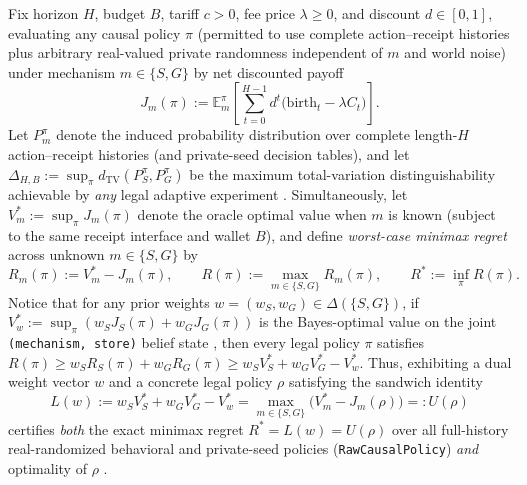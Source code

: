 \documentclass[11pt,a4paper]{article}
\begin{document}
Fix horizon \(H\), budget \(B\), tariff \(c > 0\), fee price
\(\lambda \ge 0\), and discount \(d \in [0,1]\), evaluating any causal
policy \(\pi\) (permitted to use complete action--receipt histories plus
arbitrary real-valued private randomness independent of \(m\) and world
noise) under mechanism \(m \in \{S, G\}\) by net discounted payoff
\[J_m(\pi) := \mathbb{E}_m^\pi\!\left[\sum_{t=0}^{H-1} d^t \bigl(\mathrm{birth}_t - \lambda C_t\bigr)\right].\]
Let \(P_m^\pi\) denote the induced probability distribution over
complete length-\(H\) action--receipt histories (and private-seed
decision tables), and let
\(\Delta_{H,B} := \sup_\pi d_{\mathrm{TV}}(P_S^\pi, P_G^\pi)\) be the
maximum total-variation distinguishability achievable by \emph{any}
legal adaptive experiment
\citep{blackwell1953, leCam1973, coverThomas2006}. Simultaneously, let
\(V_m^* := \sup_\pi J_m(\pi)\) denote the oracle optimal value when
\(m\) is known (subject to the same receipt interface and wallet \(B\)),
and define \emph{worst-case minimax regret} \citep{wald1950, savage1951}
across unknown \(m \in \{S, G\}\) by
\[R_m(\pi) := V_m^* - J_m(\pi), \qquad R(\pi) := \max_{m \in \{S, G\}} R_m(\pi), \qquad R^* := \inf_\pi R(\pi).\]
Notice that for any prior weights
\(w = (w_S, w_G) \in \Delta(\{S, G\})\), if
\(V_w^* := \sup_\pi (w_S J_S(\pi) + w_G J_G(\pi))\) is the Bayes-optimal
value on the joint \texttt{(mechanism,\ store)} belief state
\citep{bellman1957, blackwell1965, smallwoodSondik1973}, then every
legal policy \(\pi\) satisfies
\(R(\pi) \ge w_S R_S(\pi) + w_G R_G(\pi) \ge w_S V_S^* + w_G V_G^* - V_w^*\).
Thus, exhibiting a dual weight vector \(w\) and a concrete legal policy
\(\rho\) satisfying the sandwich identity
\[L(w) := w_S V_S^* + w_G V_G^* - V_w^* = \max_{m \in \{S,G\}} \bigl(V_m^* - J_m(\rho)\bigr) =: U(\rho)\]
certifies \emph{both} the exact minimax regret \(R^* = L(w) = U(\rho)\)
over all full-history real-randomized behavioral and private-seed
policies (\texttt{RawCausalPolicy}) \emph{and} optimality of \(\rho\)
\citep{vonNeumann1928}.

\end{document}
